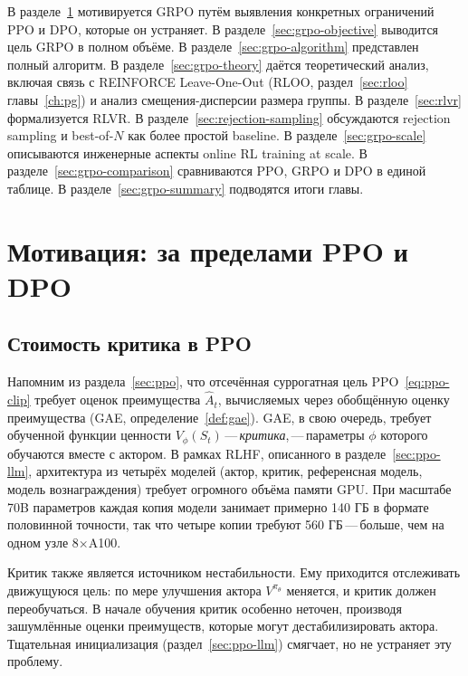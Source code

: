 В разделе~\ref{sec:grpo-motivation} мотивируется GRPO путём выявления конкретных ограничений PPO и DPO, которые он устраняет. В разделе~\ref{sec:grpo-objective} выводится цель GRPO в полном объёме. В разделе~\ref{sec:grpo-algorithm} представлен полный алгоритм. В разделе~\ref{sec:grpo-theory} даётся теоретический анализ, включая связь с REINFORCE Leave-One-Out (RLOO, раздел~\ref{sec:rloo} главы~\ref{ch:pg}) и анализ смещения-дисперсии размера группы. В разделе~\ref{sec:rlvr} формализуется RLVR. В разделе~\ref{sec:rejection-sampling} обсуждаются rejection sampling и best-of-$N$ как более простой baseline. В разделе~\ref{sec:grpo-scale} описываются инженерные аспекты online RL training at scale. В разделе~\ref{sec:grpo-comparison} сравниваются PPO, GRPO и DPO в единой таблице. В разделе~\ref{sec:grpo-summary} подводятся итоги главы.

\section{Мотивация: за пределами PPO и DPO}
\label{sec:grpo-motivation}

\subsection{Стоимость критика в PPO}

Напомним из раздела~\ref{sec:ppo}, что отсечённая суррогатная цель PPO~\eqref{eq:ppo-clip} требует оценок преимущества $\hat{A}_t$, вычисляемых через обобщённую оценку преимущества (GAE, определение~\ref{def:gae}). GAE, в свою очередь, требует обученной функции ценности $V_\phi(S_t)$\,---\,\emph{критика},\,---\,параметры $\phi$ которого обучаются вместе с актором. В рамках RLHF, описанного в разделе~\ref{sec:ppo-llm}, архитектура из четырёх моделей (актор, критик, референсная модель, модель вознаграждения) требует огромного объёма памяти GPU. При масштабе 70B параметров каждая копия модели занимает примерно 140 ГБ в формате половинной точности, так что четыре копии требуют 560 ГБ\,---\,больше, чем на одном узле 8$\times$A100.

Критик также является источником нестабильности. Ему приходится отслеживать движущуюся цель: по мере улучшения актора $V^{\pi_\theta}$ меняется, и критик должен переобучаться. В начале обучения критик особенно неточен, производя зашумлённые оценки преимуществ, которые могут дестабилизировать актора. Тщательная инициализация (раздел~\ref{sec:ppo-llm}) смягчает, но не устраняет эту проблему.

